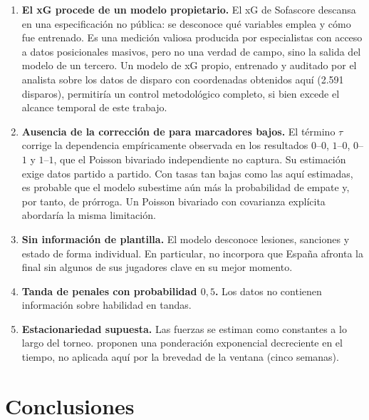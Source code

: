 \documentclass[11pt,a4paper]{article}
\begin{document}
\begin{enumerate}
\item \textbf{El xG procede de un modelo propietario.} El xG de Sofascore descansa en una especificación no pública: se desconoce qué variables emplea y cómo fue entrenado. Es una medición valiosa producida por especialistas con acceso a datos posicionales masivos, pero no una verdad de campo, sino la salida del modelo de un tercero. Un modelo de xG propio, entrenado y auditado por el analista sobre los datos de disparo con coordenadas obtenidos aquí (2.591 disparos), permitiría un control metodológico completo, si bien excede el alcance temporal de este trabajo.

\item \textbf{Ausencia de la corrección de \citet{dixoncoles1997} para marcadores bajos.} El término $\tau$ corrige la dependencia empíricamente observada en los resultados $0$--$0$, $1$--$0$, $0$--$1$ y $1$--$1$, que el Poisson bivariado independiente no captura. Su estimación exige datos partido a partido. Con tasas tan bajas como las aquí estimadas, es probable que el modelo subestime aún más la probabilidad de empate y, por tanto, de prórroga. Un Poisson bivariado con covarianza explícita \citep{karlisntzoufras2003} abordaría la misma limitación.

\item \textbf{Sin información de plantilla.} El modelo desconoce lesiones, sanciones y estado de forma individual. En particular, no incorpora que España afronta la final sin algunos de sus jugadores clave en su mejor momento.

\item \textbf{Tanda de penales con probabilidad $0{,}5$.} Los datos no contienen información sobre habilidad en tandas.

\item \textbf{Estacionariedad supuesta.} Las fuerzas se estiman como constantes a lo largo del torneo. \citet{dixoncoles1997} proponen una ponderación exponencial decreciente en el tiempo, no aplicada aquí por la brevedad de la ventana (cinco semanas).
\end{enumerate}

\section{Conclusiones}
\end{document}
